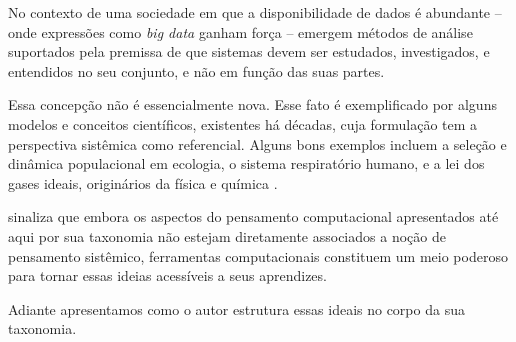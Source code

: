 No contexto de uma sociedade em que a disponibilidade de dados é abundante -- onde expressões como \textit{big data} ganham força -- emergem métodos de análise suportados pela premissa de que sistemas devem ser estudados, investigados, e entendidos no seu conjunto, e não em função das suas partes.

Essa concepção não é essencialmente nova. Esse fato é exemplificado por alguns modelos e conceitos científicos, existentes há décadas, cuja formulação tem a perspectiva sistêmica como referencial. Alguns bons exemplos incluem a seleção e dinâmica populacional em ecologia, o sistema respiratório humano, e a lei dos gases ideais, originários da física e química \cite{Weintrop2016}.

 sinaliza que embora os aspectos do pensamento computacional apresentados até aqui por sua taxonomia não estejam diretamente associados a noção de pensamento sistêmico, ferramentas computacionais constituem um meio poderoso para tornar essas ideias acessíveis a seus aprendizes.

Adiante apresentamos como o autor estrutura essas ideais no corpo da sua taxonomia. 

